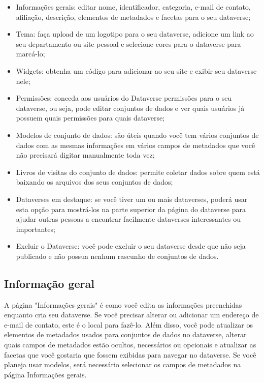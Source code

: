 \documentclass[12pt,hidelinks]{article}
\begin{document}
\begin{itemize}

    \item Informações gerais: editar nome, identificador, categoria, e-mail de contato, afiliação, descrição, elementos de metadados e facetas para o seu dataverse;
    \item Tema: faça upload de um logotipo para o seu dataverse, adicione um link ao seu departamento ou site pessoal e selecione cores para o dataverse para marcá-lo;
    \item Widgets: obtenha um código para adicionar ao seu site e exibir seu dataverse nele;
    \item Permissões: conceda aos usuários do Dataverse permissões para o seu dataverse, ou seja, pode editar conjuntos de dados e ver quais usuários já possuem quais permissões para quais dataverse;
    \item Modelos de conjunto de dados: são úteis quando você tem vários conjuntos de dados com as mesmas informações em vários campos de metadados que você não precisará digitar manualmente toda vez;
    \item Livros de visitas do conjunto de dados: permite coletar dados sobre quem está baixando os arquivos dos seus conjuntos de dados;
    \item Dataverses em destaque: se você tiver um ou mais dataverses, poderá usar esta opção para mostrá-los na parte superior da página do dataverse para ajudar outras pessoas a encontrar facilmente dataverses interessantes ou importantes;
    \item Excluir o Dataverse: você pode excluir o seu dataverse desde que não seja publicado e não possua nenhum rascunho de conjuntos de dados.
    
\end{itemize}

    \subsection{Informação geral}
    
\qquad A página "Informações gerais" é como você edita as informações preenchidas enquanto cria seu dataverse. Se você precisar alterar ou adicionar um endereço de e-mail de contato, este é o local para fazê-lo. Além disso, você pode atualizar os elementos de metadados usados para conjuntos de dados no dataverse, alterar quais campos de metadados estão ocultos, necessários ou opcionais e atualizar as facetas que você gostaria que fossem exibidas para navegar no dataverse. Se você planeja usar modelos, será necessário selecionar os campos de metadados na página Informações gerais.
\end{document}
